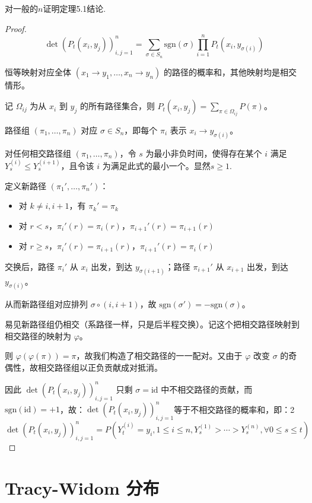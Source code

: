 \begin{4}
    对一般的$n$证明定理5.1结论.
\end{4}
\begin{proof}
    \[
\det(P_t(x_i, y_j))_{i,j=1}^n = \sum_{\sigma \in S_n} \text{sgn}(\sigma) \prod_{i=1}^n P_t(x_i, y_{\sigma(i)})
\]

恒等映射对应全体 $(x_1 \to y_1, \ldots, x_n \to y_n)$ 的路径的概率和，其他映射均是相交情形。

记 $\Omega_{ij}$ 为从 $x_i$ 到 $y_j$ 的所有路径集合，则 $P_t(x_i, y_j) = \sum_{\pi \in \Omega_{ij}} P(\pi)$。

路径组 $(\pi_1, \ldots, \pi_n)$ 对应 $\sigma \in S_n$，即每个 $\pi_i$ 表示 $x_i \to y_{\sigma(i)}$。

对任何相交路径组 $(\pi_1, \ldots, \pi_n)$，令 $s$ 为最小非负时间，使得存在某个 $i$ 满足 $Y_s^{(i)} \leq Y_s^{(i+1)}$，且令该 $i$ 为满足此式的最小一个。显然$s\ge 1$.

定义新路径 $(\pi_1', \ldots, \pi_n')$：
\begin{itemize}
\item 对 $k \neq i, i+1$，有 $\pi_k' = \pi_k$
\item 对 $r < s$，$\pi_i'(r) = \pi_i(r)$，$\pi_{i+1}'(r) = \pi_{i+1}(r)$
\item 对 $r \geq s$，$\pi_i'(r) = \pi_{i+1}(r)$，$\pi_{i+1}'(r) = \pi_i(r)$
\end{itemize}

交换后，路径 $\pi_i'$ 从 $x_i$ 出发，到达 $y_{\sigma(i+1)}$；路径 $\pi_{i+1}'$ 从 $x_{i+1}$ 出发，到达 $y_{\sigma(i)}$。

从而新路径组对应排列 $\sigma \circ (i,i+1)$，故 $\text{sgn}(\sigma') = -\text{sgn}(\sigma)$。

易见新路径组仍相交（系路径一样，只是后半程交换）。记这个把相交路径映射到相交路径的映射为 $\varphi$。

则 $\varphi(\varphi(\pi)) = \pi$，故我们构造了相交路径的一一配对。又由于 $\varphi$ 改变 $\sigma$ 的奇偶性，故相交路径组以正负贡献成对抵消。

因此 $\det(P_t(x_i,y_j))_{i,j=1}^n$ 只剩 $\sigma = \text{id}$ 中不相交路径的贡献，而 $\text{sgn}(\text{id}) = +1$，故：$\det(P_t(x_i,y_j))_{i,j=1}^n$等于不相交路径的概率和，即：2
\[
\det(P_t(x_i,y_j))_{i,j=1}^n = P(Y_t^{(i)} = y_i, 1 \leq i \leq n, Y_s^{(1)} > \cdots > Y_s^{(n)}, \forall 0 \leq s \leq t)
\]
\end{proof}
\section{ Tracy-Widom 分布}


